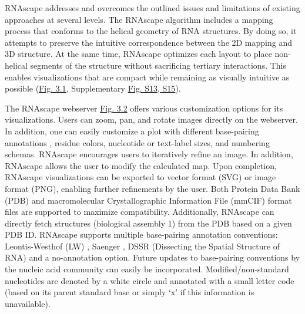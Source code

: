 \par
RNAscape addresses and overcomes the outlined issues and limitations of existing approaches at several levels. The RNAscape algorithm includes a mapping process that conforms to the helical geometry of RNA structures. By doing so, it attempts to preserve the intuitive correspondence between the 2D mapping and 3D structure. At the same time, RNAscape optimizes each layout to place non-helical segments of the structure without sacrificing tertiary interactions. This enables visualizations that are compact while remaining as visually intuitive as possible (\hyperref[fig:rnascape1]{Fig. 3.1}, Supplementary \hyperref[fig:rnascapeS1]{Fig. S13, S15}).
\par
The RNAscape webserver \hyperref[fig:rnascape2]{Fig. 3.2} offers various customization options for its visualizations. Users can zoom, pan, and rotate images directly on the webserver. In addition, one can easily customize a plot with different base-pairing annotations \citep{Yang2003, Saenger1984,lu2015dssr}, residue colors, nucleotide or text-label sizes, and numbering schemas. RNAscape encourages users to iteratively refine an image. In addition, RNAscape allows the user to modify the calculated map. Upon completion, RNAscape visualizations can be exported to vector format (SVG) or image format (PNG), enabling further refinements by the user. Both Protein Data Bank (PDB) and macromolecular Crystallographic Information File (mmCIF) format files are supported to maximize compatibility. Additionally, RNAscape can directly fetch structures (biological assembly 1) from the PDB \citep{berman2000protein,} based on a given PDB ID. RNAscape supports multiple base-pairing annotation conventions: Leontis-Westhof (LW) \citep{Yang2003}, Saenger \citep{Saenger1984}, DSSR (Dissecting the Spatial Structure of RNA) \citep{lu2015dssr} and a no-annotation option. Future updates to base-pairing conventions by the nucleic acid community can easily be incorporated. Modified/non-standard nucleotides are denoted by a white circle and annotated with a small letter code (based on its parent standard base or simply ‘x’ if this information is unavailable).
